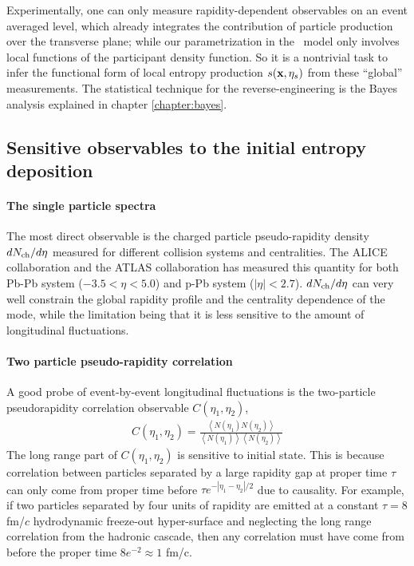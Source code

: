 Experimentally, one can only measure rapidity-dependent observables on an event averaged level, which already integrates the contribution of particle production over the transverse plane; while our parametrization in the \trento\ model only involves local functions of the participant density function.
So it is a nontrivial task to infer the functional form of local entropy production $s(\mathbf x, \eta_s)$ from these ``global'' measurements.
The statistical technique for the reverse-engineering is the Bayes analysis explained in chapter \ref{chapter:bayes}.

\subsection{Sensitive observables to the initial entropy deposition}
\paragraph{The single particle spectra}
The most direct observable is the charged particle pseudo-rapidity density $dN_\text{ch}/d\eta$ measured for different collision systems and centralities.
The ALICE collaboration and the ATLAS collaboration has measured this quantity for both Pb-Pb system ($-3.5<\eta<5.0$) and p-Pb system ($|\eta| < 2.7$).
$dN_\text{ch}/d\eta$ can very well constrain the global rapidity profile and the centrality dependence of the mode, while the limitation being that it is less sensitive to the amount of longitudinal fluctuations.

\paragraph{Two particle pseudo-rapidity correlation}
A good probe of event-by-event longitudinal fluctuations is the two-particle pseudorapidity correlation observable $C(\eta_1, \eta_2)$,
\begin{eqnarray}
C(\eta_1, \eta_2) = \frac{ \left\langle N(\eta_1)N(\eta_2) \right\rangle}{\left\langle N(\eta_1)\right\rangle\left\langle N(\eta_2) \right\rangle}
\end{eqnarray}
The long range part of $C(\eta_1, \eta_2)$ is sensitive to initial state.
This is because correlation between particles separated by a large rapidity gap at proper time $\tau$ can only come from proper time before $\tau e^{-|\eta_1-\eta_2|/2}$ due to causality.
For example, if two particles separated by four units of rapidity are emitted at a constant $\tau = 8$ fm/$c$ hydrodynamic freeze-out hyper-surface and neglecting the long range correlation from the hadronic cascade, then any correlation must have come from before the proper time $ 8 e^{-2}\approx 1$ fm/c.

